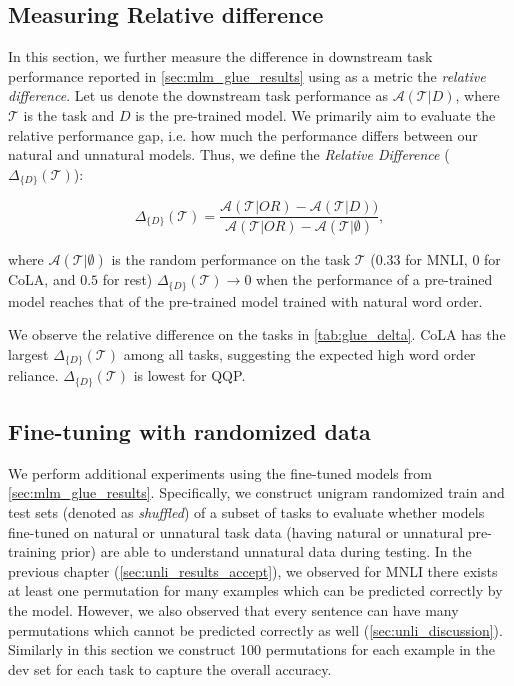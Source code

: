 \documentclass[letterpaper, 12pt]{report}
\begin{document}
\subsection{Measuring Relative difference}
\label{sec:mlm_rd}

In this section, we further measure the difference in downstream task performance reported in \autoref{sec:mlm_glue_results} using as a metric the \textit{relative difference}. Let us denote the downstream task performance as $\mathcal{A}(\mathcal{T} | D)$, where $\mathcal{T}$ is the task and $D$ is the pre-trained model. We primarily aim to evaluate the relative performance gap, i.e. how much the performance differs between our natural and unnatural models. Thus, we define the \textit{Relative Difference} ($\Delta_{\{D\}}(\mathcal{T})$):

\begin{equation}
 \Delta_{\{D\}}(\mathcal{T}) =  \frac{\mathcal{A}(\mathcal{T} | OR) - \mathcal{A}(\mathcal{T} | D))}{\mathcal{A}(\mathcal{T} | OR) - \mathcal{A}(\mathcal{T} | \emptyset)},
\end{equation}

where $\mathcal{A}(\mathcal{T} | \emptyset)$ is the random performance on the task $\mathcal{T}$ ($0.33$ for MNLI, $0$ for CoLA, and $0.5$ for rest)
$\Delta_{\{D\}}(\mathcal{T}) \rightarrow 0$ when the performance of a pre-trained model reaches that of the pre-trained model trained with natural word order.

We observe the relative difference on the tasks in \autoref{tab:glue_delta}. CoLA has the largest $\Delta_{\{D\}}(\mathcal{T})$ among all tasks, suggesting the expected high word order reliance. $\Delta_{\{D\}}(\mathcal{T})$ is lowest for QQP. %



\subsection{Fine-tuning with randomized data}
\label{sec:mlm_rand_eval}




We perform additional experiments using the fine-tuned models from \autoref{sec:mlm_glue_results}. Specifically, we construct unigram randomized train and test sets (denoted as \textit{shuffled}) of a subset of tasks to evaluate whether models fine-tuned on natural or unnatural task data (having natural or unnatural pre-training prior) are able to understand unnatural data during testing. In the previous chapter (\autoref{sec:unli_results_accept}), we observed for MNLI there exists at least one permutation for many examples which can be predicted correctly by the model. However, we also observed that every sentence can have many permutations which cannot be predicted correctly as well (\autoref{sec:unli_discussion}). Similarly in this section we construct 100 permutations for each example in the dev set for each task to capture the overall accuracy.
\end{document}
